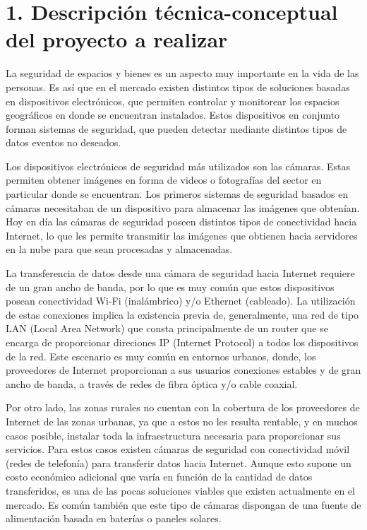 \documentclass[
11pt, %
codirector, %
]{plan}
\begin{document}
\section{1. Descripción técnica-conceptual del proyecto a realizar}
\label{sec:descripcion}

La seguridad de espacios y bienes es un aspecto muy importante en la vida de las personas. Es así que en el mercado existen distintos tipos de soluciones basadas en dispositivos electrónicos, que permiten controlar y monitorear los espacios geográficos en donde se encuentran instalados. Estos dispositivos en conjunto forman sistemas de seguridad, que pueden detectar mediante distintos tipos de datos eventos no deseados.

Los dispositivos electrónicos de seguridad más utilizados son las cámaras. Estas permiten obtener imágenes en forma de videos o fotografías del sector en particular donde se encuentran. Los primeros sistemas de seguridad basados en cámaras necesitaban de un dispositivo para almacenar las imágenes que obtenían. Hoy en día las cámaras de seguridad poseen distintos tipos de conectividad hacia Internet, lo que les permite transmitir las imágenes que obtienen hacia servidores en la nube para que sean procesadas y almacenadas.

La transferencia de datos desde una cámara de seguridad hacia Internet requiere de un gran ancho de banda, por lo que es muy común que estos dispositivos posean conectividad Wi-Fi (inalámbrico) y/o Ethernet (cableado). La utilización de estas conexiones implica la existencia previa de, generalmente, una red de tipo LAN (Local Area Network) que consta principalmente de un router que se encarga de proporcionar direciones IP (Internet Protocol) a todos los dispositivos de la red. Este escenario es muy común en entornos urbanos, donde, los proveedores de Internet proporcionan a sus usuarios conexiones estables y de gran ancho de banda, a través de redes de fibra óptica y/o cable coaxial.

Por otro lado, las zonas rurales no cuentan con la cobertura de los proveedores de Internet de las zonas urbanas, ya que a estos no les resulta rentable, y en muchos casos posible, instalar toda la infraestructura necesaria para proporcionar sus servicios. Para estos casos existen cámaras de seguridad con conectividad móvil (redes de telefonía) para transferir datos hacia Internet. Aunque esto supone un costo económico adicional que varía en función de la cantidad de datos transferidos, es una de las pocas soluciones viables que existen actualmente en el mercado. Es común también que este tipo de cámaras dispongan de una fuente de alimentación basada en baterías o paneles solares.
\end{document}
